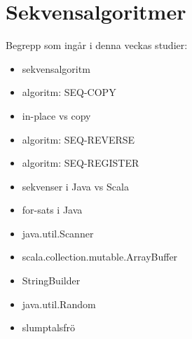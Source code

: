 \chapter{Sekvensalgoritmer}\label{chapter:W05}
Begrepp som ingår i denna veckas studier:
\begin{itemize}[noitemsep,label={$\square$},leftmargin=*]
\item sekvensalgoritm
\item algoritm: SEQ-COPY
\item in-place vs copy
\item algoritm: SEQ-REVERSE
\item algoritm: SEQ-REGISTER
\item sekvenser i Java vs Scala
\item for-sats i Java
\item java.util.Scanner
\item scala.collection.mutable.ArrayBuffer
\item StringBuilder
\item java.util.Random
\item slumptalsfrö\end{itemize}
